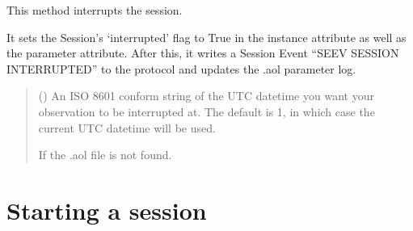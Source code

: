 \documentclass[letterpaper,10pt,english]{sphinxmanual}
\begin{document}
\begin{fulllineitems}
\label{\detokenize{usage:aop.Session.interrupt}}
\pysigstartsignatures
{}
\pysigstopsignatures
\sphinxAtStartPar
This method interrupts the session.

\sphinxAtStartPar
It sets the Session’s ‘interrupted’ flag to True in the instance
attribute as well as the parameter attribute. After this, it writes a
Session Event “SEEV SESSION INTERRUPTED” to the protocol and updates
the .aol parameter log.
\begin{quote}\begin{description}
\sphinxAtStartPar
{} () \textendash{} An ISO 8601 conform string of the UTC datetime you want your
observation to be interrupted at. The default is \sphinxhyphen{}1, in which case
the current UTC datetime will be used.

\sphinxAtStartPar
{\hyperref[\detokenize{usage:aop.AolNotFoundError.AolNotFoundError}]{}} \textendash{} If the .aol file is not found.

\end{description}\end{quote}

\end{fulllineitems}


\begin{fulllineitems}
\label{\detokenize{usage:aop.AolNotFoundError.AolNotFoundError}}
\pysigstartsignatures
{}
\pysigstopsignatures
\end{fulllineitems}



\section{Starting a session}
\label{\detokenize{usage:starting-a-session}}
\sphinxstepscope
\end{document}
